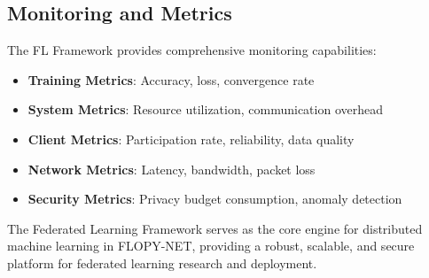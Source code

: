 \subsection{Monitoring and Metrics}

The FL Framework provides comprehensive monitoring capabilities:

\begin{itemize}
    \item \textbf{Training Metrics}: Accuracy, loss, convergence rate
    \item \textbf{System Metrics}: Resource utilization, communication overhead
    \item \textbf{Client Metrics}: Participation rate, reliability, data quality
    \item \textbf{Network Metrics}: Latency, bandwidth, packet loss
    \item \textbf{Security Metrics}: Privacy budget consumption, anomaly detection
\end{itemize}

The Federated Learning Framework serves as the core engine for distributed machine learning in FLOPY-NET, providing a robust, scalable, and secure platform for federated learning research and deployment.
